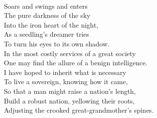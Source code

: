 \documentclass[smalldemyvopaper,11pt,twoside,onecolumn,openright,extrafontsizes]{memoir}
\begin{document}
\\Soars and swings and enters
\\The pure darkness of the sky
\\Into the iron heart of the night,
\\As a seedling's dreamer tries
\\To turn his eyes to its own shadow.
\\In the most costly services of a great society
\\One may find the allure of a benign intelligence.
\\I have hoped to inherit what is necessary
\\To live a sovereign, knowing how it came,
\\So that a man might raise a nation's length,
\\Build a robust nation, yellowing their roots,
\\Adjusting the crooked great-grandmother's spines.
\end{document}
